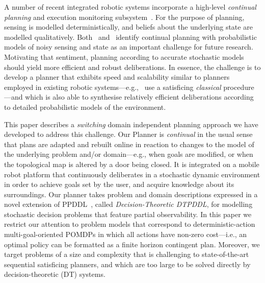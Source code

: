 



A number of recent integrated robotic systems incorporate a
high-level {\em continual planning} and execution monitoring
subsystem~\cite{wyattetal2010tamd,talamadupula:2010,Kraft2008}.
For the purpose of planning, sensing is modelled
deterministically, and beliefs about the underlying state are
modelled qualitatively.
Both~\citeauthor{talamadupula:2010} and~\citeauthor{wyattetal2010tamd}
identify
continual planning with probabilistic
models of noisy sensing and state as an important challenge for future
research.
Motivating that sentiment, planning according to accurate
stochastic models should yield more efficient and robust
deliberations.
In essence, the challenge is to develop a planner that
exhibits speed and scalability similar to planners employed in
existing robotic systems---e.g.,~\citeauthor{wyattetal2010tamd} use a
satisficing {\em classical} procedure---and which is also able to
synthesise relatively efficient deliberations according to detailed
probabilistic models of the environment.


This paper describes a {\em switching} domain independent planning
approach we have developed to address this challenge. 
Our Planner is {\em continual} in the usual sense that plans are
adapted and rebuilt online in reaction to changes to the model of the
underlying problem and/or domain---e.g., when goals are
modified, or when the topological map is altered by a door being
closed.
It is integrated on a mobile robot platform that continuously
deliberates in a stochastic dynamic environment in order to achieve
goals set by the user, and acquire knowledge about its surroundings.
Our planner takes problem and domain descriptions expressed in a novel
extension of PPDDL~\cite{younes:etal:2005}, called {\em
Decision-Theoretic DTPDDL}, for modelling stochastic decision
problems that feature partial observability.  In this paper we
restrict our attention to problem models that correspond to
deterministic-action multi-goal-oriented POMDPs 
in which all actions have
non-zero cost---i.e., an optimal policy can be formatted as a finite
horizon contingent plan. Moreover, we target problems of a size and
complexity that is challenging to state-of-the-art sequential
satisficing planners, and which are too large to be solved directly by
decision-theoretic (DT) systems.

